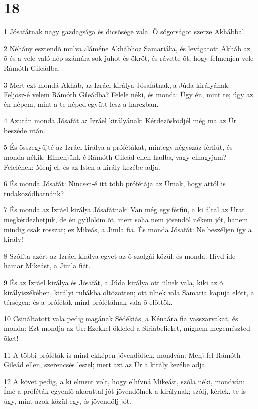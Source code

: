 \chapter{18}

\par 1 Jósafátnak nagy gazdagsága és dicsõsége vala. Õ sógorságot  szerze Akhábbal.
\par 2 Néhány esztendõ mulva aláméne Akhábhoz Samariába, és levágatott Akháb az õ és a vele való nép számára sok juhot és ökröt, és rávette õt, hogy felmenjen vele Rámóth Gileádba.
\par 3 Mert ezt mondá Akháb, az Izráel királya Jósafátnak, a Júda királyának: Feljösz-é velem Rámóth Gileádba? Felele néki, és monda: Úgy én, mint te; úgy az én népem, mint a te néped együtt lesz a harczban.
\par 4 Azután monda Jósafát az Izráel királyának: Kérdezõsködjél még ma az Úr beszéde után.
\par 5 És összegyûjté az Izráel királya a prófétákat, mintegy négyszáz férfiút, és monda nékik: Elmenjünk-é Rámóth Gileád ellen hadba, vagy elhagyjam? Felelének: Menj el, és az Isten a király kezébe adja.
\par 6 És monda Jósafát: Nincsen-é itt több prófétája az Úrnak, hogy attól is tudakozódhatnánk?
\par 7 És monda az Izráel királya Jósafátnak: Van még egy férfiú, a ki által az Urat megkérdezhetjük, de én gyûlölöm õt, mert soha nem jövendöl nékem jót, hanem mindig csak rosszat; ez Mikeás, a Jimla fia. És monda Jósafát: Ne beszéljen így a király!
\par 8 Szólíta azért az Izráel királya egyet az õ szolgái közül, és monda: Hívd ide hamar Mikeást, a Jimla fiát.
\par 9 És az Izráel királya és Jósafát, a Júda királya ott ülnek vala, kiki az õ királyiszékében, királyi ruhákba öltözötten; ott ülnek vala Samaria kapuja elõtt, a térségen; és a próféták mind prófétálnak vala õ elõttök.
\par 10 Csináltatott vala pedig magának Sédékiás, a Kénaána fia vasszarvakat, és monda: Ezt mondja az Úr: Ezekkel ökleled a Siriabelieket, mígnem megemészted õket!
\par 11 A többi próféták is mind ekképen jövendöltek, mondván: Menj fel Rámóth Gileád ellen, szerencsés leszel; mert azt az Úr a király kezébe adja.
\par 12 A követ pedig, a ki elment volt, hogy elhívná Mikeást, szóla néki, mondván: Ímé a próféták egyenlõ akarattal jót jövendölnek a királynak; szólj, kérlek, te is úgy, mint azok közül egy, és jövendölj jót.
